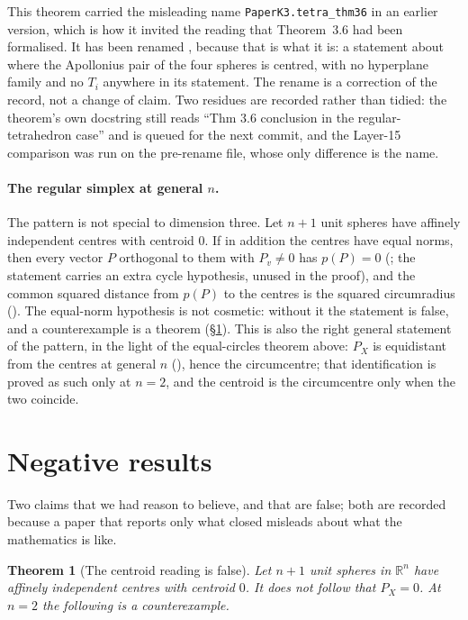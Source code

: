 \documentclass[11pt]{article}
\newtheorem{theorem}{Theorem}
\theoremstyle{definition}
\theoremstyle{remark}
\newcommand{\RR}{\mathbb{R}}
\begin{document}
This theorem carried the misleading name \texttt{PaperK3.tetra\_thm36} in an earlier version, which is
how it invited the reading that Theorem~3.6 had been formalised. It has been renamed
, because that is what it is: a statement about where the
Apollonius pair of the four spheres is centred, with no hyperplane family and no $T_i$ anywhere in
its statement. The rename is a correction of the record, not a change of claim. Two residues are recorded rather
than tidied: the theorem's own docstring still reads ``Thm 3.6 conclusion in the regular-tetrahedron
case'' and is queued for the next commit, and the Layer-15 comparison was run on the pre-rename file,
whose only difference is the name.

\paragraph{The regular simplex at general $n$.} The pattern is not special to dimension three. Let
$n+1$ unit spheres have affinely independent centres with centroid $0$. If in addition the centres
have equal norms, then every vector $P$ orthogonal to them with $P_v\neq0$ has $p(P)=0$
(; the statement carries an extra cycle hypothesis, unused in the proof), and
the common squared distance from $p(P)$ to the centres is the squared circumradius
(). The equal-norm hypothesis is not
cosmetic: without it the statement is false, and a counterexample is a theorem
(\S\ref{sec:negative}). This is also the right general statement of the pattern, in the light of the
equal-circles theorem above: $P_X$ is equidistant from the centres at general $n$
(), hence the circumcentre; that identification is proved as such only
at $n=2$, and the centroid is the circumcentre only when the two coincide.

\section{Negative results}\label{sec:negative}

Two claims that we had reason to believe, and that are false; both are recorded because a paper that
reports only what closed misleads about what the mathematics is like.

\begin{theorem}[The centroid reading is false]\label{thm:negative}
Let $n+1$ unit spheres in $\RR^n$ have affinely independent centres with centroid $0$. It does
\emph{not} follow that $P_X=0$. At $n=2$ the following is a counterexample.
\end{theorem}
\end{document}
